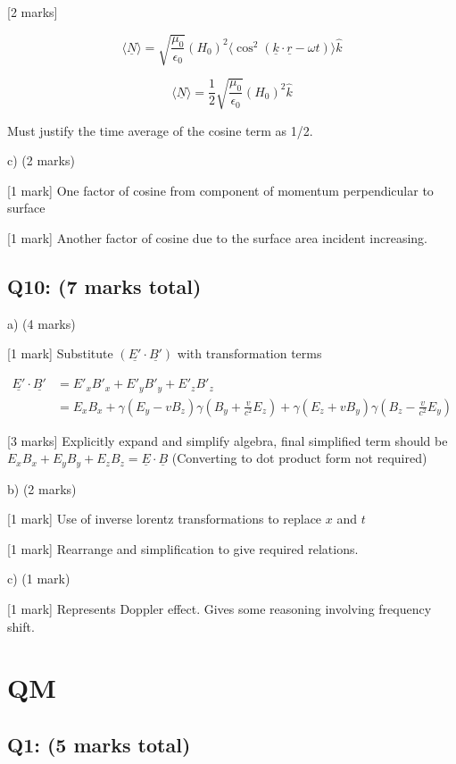 \documentclass[a4paper,11pt]{article}
\begin{document}
[2 marks] 

\[ \langle \underline{N} \rangle = \sqrt{\frac{\mu_0}{\epsilon_0}} (H_0)^2 \langle \cos^2(\underline{k} \cdot \underline{r} - \omega t) \rangle \hat{k} \]

\[ \langle \underline{N} \rangle = \frac{1}{2}\sqrt{\frac{\mu_0}{\epsilon_0}} (H_0)^2 \hat{k} \]

Must justify the time average of the cosine term as 1/2.

c) (2 marks) 

[1 mark] One factor of cosine from component of momentum perpendicular to surface

[1 mark] Another factor of cosine due to the surface area incident increasing. 



\subsection*{Q10: (7 marks total)}

a) (4 marks)

[1 mark] Substitute \( (\underline{E'} \cdot \underline{B'}) \) with transformation terms

\begin{align*}
    \underline{E'} \cdot \underline{B'} & = E'_x B'_x + E'_y B'_y + E'_z B'_z \\ & = E_{x} B_{x} + \gamma(E_{y} - vB_{z}) \gamma(B_{y} + \frac{v}{c^{2}} E_{z}) + \gamma(E_{z} + vB_{y}) \gamma(B_{z} - \frac{v}{c^{2}} E_{y})
\end{align*}

[3 marks] Explicitly expand and simplify algebra, final simplified term should be \( E_x B_x + E_y B_y + E_z B_z = \underline{E} \cdot \underline{B} \) (Converting to dot product form not required)

b) (2 marks)

[1 mark] Use of inverse lorentz transformations to replace \( x \) and \( t \)

[1 mark] Rearrange and simplification to give required relations.

c) (1 mark)

[1 mark] Represents Doppler effect. Gives some reasoning involving frequency shift.

\section{QM}

\subsection*{Q1: (5 marks total)}
\end{document}
